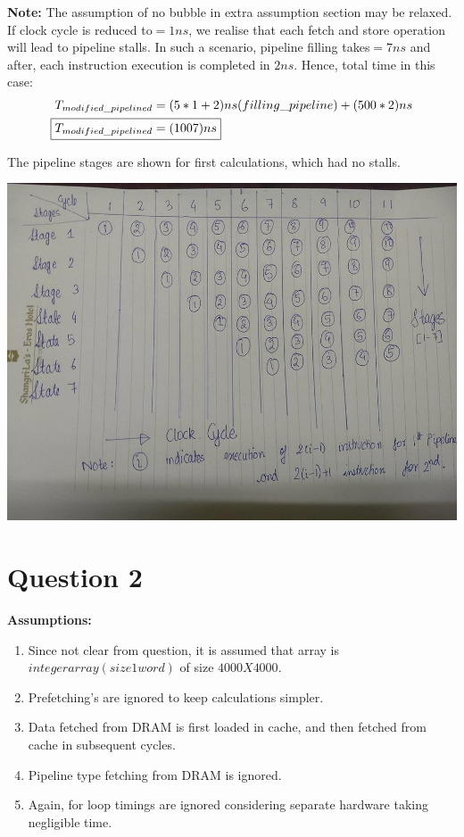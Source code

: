 \documentclass{article}
\newcommand{\bld}[1]{\textbf{#1}}
\begin{document}
\bld{Note:} The assumption of no bubble in extra assumption section may be relaxed. If clock cycle is reduced to$=1ns$, we realise that each fetch and store operation will lead to pipeline stalls. In such a scenario, pipeline filling takes$=7ns$ and after, each instruction execution is completed in $2ns$. Hence, total time in this case:
\begin{align*}
T_{modified\_pipelined} &=(5*1+2)ns(filling\_pipeline) + (500*2)ns\\
\Aboxed{T_{modified\_pipelined} &=(1007)ns}
\end{align*}

The pipeline stages are shown for first calculations, which had no stalls.

\hspace*{-2.4cm}
\includegraphics[scale=0.55]{Pipeline.jpg}


\section*{Question 2}
\bld{Assumptions:}
\begin{enumerate}
  \item Since not clear from question, it is assumed that array is $integer array(size 1 word)$ of size $4000 X 4000$.
  \item Prefetching's are ignored to keep calculations simpler.
  \item Data fetched from DRAM is first loaded in cache, and then fetched from cache in subsequent cycles.
  \item Pipeline type fetching from DRAM is ignored.
  \item Again, for loop timings are ignored considering separate hardware taking negligible time.
\end{enumerate}
\end{document}
